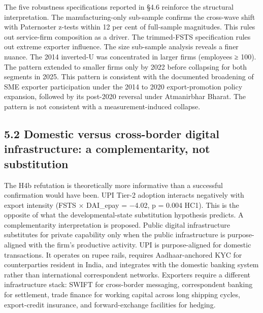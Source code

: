 \documentclass[
  12pt]{article}
\begin{document}
The five robustness specifications reported in §4.6 reinforce the
structural interpretation. The manufacturing-only sub-sample confirms
the cross-wave shift with Paternoster z-tests within 12 per cent of
full-sample magnitudes. This rules out service-firm composition as a
driver. The trimmed-FSTS specification rules out extreme exporter
influence. The size sub-sample analysis reveals a finer nuance. The 2014
inverted-U was concentrated in larger firms (employees ≥ 100). The
pattern extended to smaller firms only by 2022 before collapsing for
both segments in 2025. This pattern is consistent with the documented
broadening of SME exporter participation under the 2014 to 2020
export-promotion policy expansion, followed by its post-2020 reversal
under Atmanirbhar Bharat. The pattern is not consistent with a
measurement-induced collapse.

\hypertarget{domestic-versus-cross-border-digital-infrastructure-a-complementarity-not-substitution}{%
\subsection{5.2 Domestic versus cross-border digital infrastructure: a
complementarity, not
substitution}\label{domestic-versus-cross-border-digital-infrastructure-a-complementarity-not-substitution}}

The H4b refutation is theoretically more informative than a successful
confirmation would have been. UPI Tier-2 adoption interacts negatively
with export intensity (FSTS × DAI\_epay = −4.02, p = 0.004 HC1). This is
the opposite of what the developmental-state substitution hypothesis
predicts. A complementarity interpretation is proposed. Public digital
infrastructure substitutes for private capability only when the public
infrastructure is purpose-aligned with the firm's productive activity.
UPI is purpose-aligned for domestic transactions. It operates on rupee
rails, requires Aadhaar-anchored KYC for counterparties resident in
India, and integrates with the domestic banking system rather than
international correspondent networks. Exporters require a different
infrastructure stack: SWIFT for cross-border messaging, correspondent
banking for settlement, trade finance for working capital across long
shipping cycles, export-credit insurance, and forward-exchange
facilities for hedging.
\end{document}
